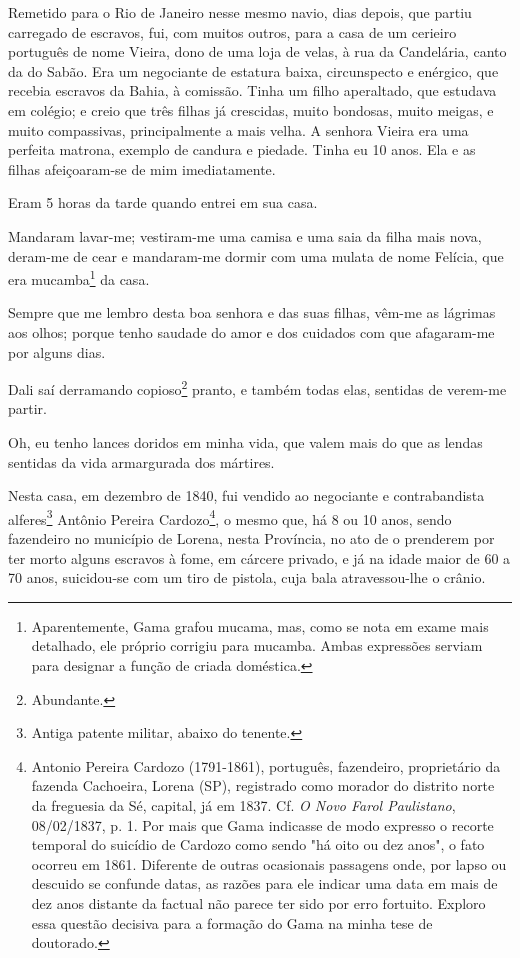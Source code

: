 Remetido para o Rio de Janeiro nesse mesmo navio, dias depois, que
partiu carregado de escravos, fui, com muitos outros, para a casa de um
cerieiro português de nome Vieira, dono de uma loja de velas, à rua da
Candelária, canto da do Sabão. Era um negociante de estatura baixa,
circunspecto e enérgico, que recebia escravos da Bahia, à comissão.
Tinha um filho aperaltado, que estudava em colégio; e creio que três
filhas já crescidas, muito bondosas, muito meigas, e muito compassivas,
principalmente a mais velha. A senhora Vieira era uma perfeita matrona,
exemplo de candura e piedade. Tinha eu 10 anos. Ela e as filhas
afeiçoaram-se de mim imediatamente.

Eram 5 horas da tarde quando entrei em sua casa.

Mandaram lavar-me; vestiram-me uma camisa e uma saia da filha mais nova,
deram-me de cear e mandaram-me dormir com uma mulata de nome Felícia,
que era mucamba\footnote{Aparentemente, Gama grafou mucama, mas, como
  se nota em exame mais detalhado, ele próprio corrigiu para mucamba.
  Ambas expressões serviam para designar a função de criada doméstica.}
da casa.

Sempre que me lembro desta boa senhora e das suas filhas, vêm-me as
lágrimas aos olhos; porque tenho saudade do amor e dos cuidados com que
afagaram-me por alguns dias.

Dali saí derramando copioso\footnote{Abundante.} pranto, e também
todas elas, sentidas de verem-me partir.

Oh, eu tenho lances doridos em minha vida, que valem mais do que as
lendas sentidas da vida armargurada dos mártires.

Nesta casa, em dezembro de 1840, fui vendido ao negociante e
contrabandista alferes\footnote{Antiga patente militar, abaixo do
  tenente.} Antônio Pereira Cardozo\footnote{Antonio Pereira Cardozo
  (1791-1861), português, fazendeiro, proprietário da fazenda Cachoeira,
  Lorena (SP), registrado como morador do distrito norte da freguesia da
  Sé, capital, já em 1837. Cf. \emph{O Novo Farol Paulistano},
  08/02/1837, p. 1. Por mais que Gama indicasse de modo expresso o
  recorte temporal do suicídio de Cardozo como sendo "há oito ou dez
  anos", o fato ocorreu em 1861. Diferente de outras ocasionais
  passagens onde, por lapso ou descuido se confunde datas, as razões
  para ele indicar uma data em mais de dez anos distante da factual não
  parece ter sido por erro fortuito. Exploro essa questão decisiva para
  a formação do Gama na minha tese de doutorado.}, o mesmo que, há 8 ou
10 anos, sendo fazendeiro no município de Lorena, nesta Província, no
ato de o prenderem por ter morto alguns escravos à fome, em cárcere
privado, e já na idade maior de 60 a 70 anos, suicidou-se com um tiro de
pistola, cuja bala atravessou-lhe o crânio.

